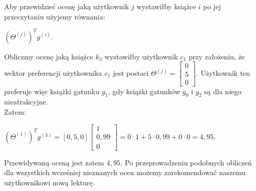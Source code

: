 \documentclass[12pt,a4paper]{report}
\begin{document}
\\
\\Aby przewidzieć ocenę jaką użytkownik $j$ wystawiłby książce $i$ po jej przeczytaniu użyjemy równania:
\begin{center}
$(\Theta^{(j)})^T g^{(i)}$.
\end{center}
\bigskip
Obliczmy ocenę jaką książce $k_3$ wystawiłby użytkownik $c_1$ przy założeniu, że wektor preferencji użytkownika $c_1$ jest postaci $\Theta^{(j)}= \left[
        \begin{array}{c}
         0 \\
         5\\
         0
         \end{array}
      \right] $. Użytkownik ten preferuje więc książki gatunku $g_1$, gdy książki gatunków $g_0$ i $g_2$ są dla niego nieatrakcyjne.
\\Zatem:
\begin{center}
$(\Theta^{(1)})^T g^{(3)} = [0,5,0] \left[
        \begin{array}{c}
         1 \\
         0,99\\
         0
         \end{array}
      \right] = 0 \cdot 1 + 5 \cdot 0,99 + 0 \cdot 0 = 4,95$.
\end{center}
Przewidywaną oceną jest zatem $4,95$. Po przeprowadzeniu podobnych obliczeń dla wszystkich wcześniej nieznanych ocen możemy zarekomendować naszemu użytkownikowi nową lekturę.
\end{document}
